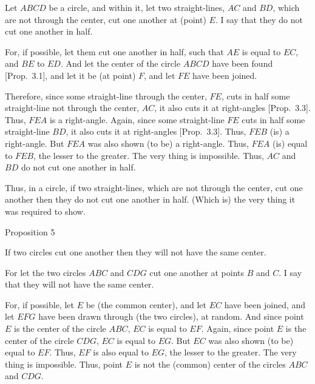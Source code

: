 Let $ABCD$ be a circle, and within it, let two straight-lines, $AC$ and
$BD$, which are not through the center, cut one another at  (point) $E$. I say that they
do not cut one another in half.

For, if possible, let them cut one another in half, such that $AE$ is equal to $EC$, and
$BE$ to $ED$. And let the center of the circle $ABCD$ have been found [Prop.~3.1], and let it be (at point) $F$, and let $FE$ have been joined.

Therefore, since some straight-line through the center, $FE$, cuts in half
some straight-line not through the center, $AC$, it also cuts it at right-angles
[Prop.~3.3]. Thus, $FEA$ is a right-angle. Again, since some straight-line
$FE$ cuts in half some straight-line $BD$, it also cuts it at right-angles [Prop.~3.3]. Thus, $FEB$ (is) a right-angle. But $FEA$ was also shown (to be) a right-angle. Thus, $FEA$ (is) equal to $FEB$, the lesser to the greater.
The very thing is impossible. Thus, $AC$ and $BD$ do not cut one another in half.

\epsfysize=2in
\centerline{}

Thus, in a circle, if two straight-lines, which are not through the center, cut
one another then they do not cut one another in half. (Which is) the very
thing it was required to show.


\begin{center}
{\large Proposition 5}
\end{center}

If two circles cut one another then they will not have the same center.

\epsfysize=2in
\centerline{}

For let the two circles $ABC$ and $CDG$ cut one another at  points $B$ and $C$.
I say that they will not have the same center.

For, if possible, let $E$ be (the common center), and let $EC$ have been joined,
and let $EFG$ have been drawn through (the two circles), at random. And since point $E$
is the center of the circle $ABC$, $EC$ is equal to $EF$. Again, since point $E$ is
the center of the circle $CDG$, $EC$ is equal to $EG$. But $EC$  was also shown (to be) equal to $EF$. Thus, $EF$ is also equal to $EG$, the lesser to the
greater. The very thing is impossible. Thus, point $E$ is not the (common)
center of the circles $ABC$ and $CDG$.

